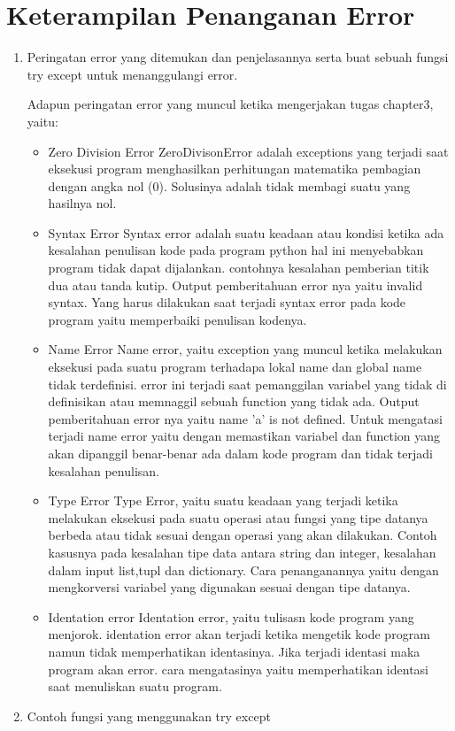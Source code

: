 \section{Keterampilan Penanganan Error}
\begin{enumerate}
	\item Peringatan error yang ditemukan dan penjelasannya serta buat sebuah fungsi try except untuk menanggulangi error.
	
	Adapun peringatan error yang muncul ketika mengerjakan tugas chapter3, yaitu:
	\begin{itemize}
		\item Zero Division Error
		ZeroDivisonError adalah exceptions yang terjadi saat eksekusi program menghasilkan perhitungan matematika pembagian dengan angka nol (0). Solusinya adalah tidak membagi suatu yang hasilnya nol.

	    \item Syntax Error
        Syntax error adalah suatu keadaan atau kondisi ketika ada kesalahan penulisan kode pada program python hal ini menyebabkan program tidak dapat dijalankan. contohnya kesalahan pemberian titik dua atau tanda kutip. Output pemberitahuan error nya yaitu invalid syntax. Yang harus dilakukan saat terjadi syntax error pada kode program yaitu memperbaiki penulisan kodenya.
   
        \item Name Error
        Name error, yaitu exception yang muncul ketika melakukan eksekusi pada suatu program terhadapa lokal name dan global name tidak terdefinisi. error ini terjadi saat pemanggilan variabel yang tidak di definisikan atau memnaggil sebuah function yang tidak ada. Output pemberitahuan error nya yaitu name 'a' is not defined. Untuk mengatasi terjadi name error yaitu dengan memastikan variabel dan function yang akan dipanggil benar-benar ada dalam kode program dan tidak terjadi kesalahan penulisan.
   
        \item Type Error
        Type Error, yaitu suatu keadaan yang terjadi ketika melakukan eksekusi pada suatu operasi atau fungsi yang tipe datanya berbeda atau tidak sesuai dengan operasi yang akan dilakukan. Contoh kasusnya pada kesalahan tipe data antara string dan integer, kesalahan dalam input list,tupl dan dictionary. Cara penanganannya yaitu dengan mengkorversi variabel yang digunakan sesuai dengan tipe datanya.
   
        \item Identation error
        Identation error, yaitu tulisasn kode program yang menjorok. identation error akan terjadi ketika mengetik kode program namun tidak memperhatikan identasinya. Jika terjadi identasi maka program akan error. cara mengatasinya yaitu memperhatikan identasi saat menuliskan suatu program.
	\end{itemize}
	
\item Contoh fungsi yang menggunakan try except

\end{enumerate}

